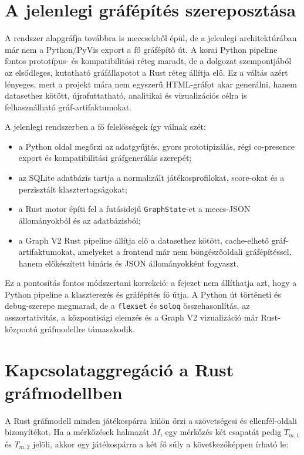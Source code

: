 ﻿\documentclass[a4paper,12pt]{report}
\begin{document}
\section{A jelenlegi gráfépítés szereposztása}

A rendszer alapgráfja továbbra is meccsekből épül, de a jelenlegi architektúrában már nem a Python/PyVis export a fő gráfépítő út. A korai Python pipeline fontos prototípus- és kompatibilitási réteg maradt, de a dolgozat szempontjából az elsődleges, kutatható gráfállapotot a Rust réteg állítja elő. Ez a váltás azért lényeges, mert a projekt mára nem egyszerű HTML-gráfot akar generálni, hanem datasethez kötött, újrafuttatható, analitikai és vizualizációs célra is felhasználható gráf-artifaktumokat.

A jelenlegi rendszerben a fő felelősségek így válnak szét:

\begin{itemize}
    \item a Python oldal megőrzi az adatgyűjtés, gyors prototipizálás, régi co-presence export és kompatibilitási gráfgenerálás szerepét;
    \item az SQLite adatbázis tartja a normalizált játékosprofilokat, score-okat és a perzisztált klasztertagságokat;
    \item a Rust motor építi fel a futásidejű \texttt{GraphState}-et a meccs-JSON állományokból és az adatbázisból;
    \item a Graph V2 Rust pipeline állítja elő a datasethez kötött, cache-elhető gráf-artifaktumokat, amelyeket a frontend már nem böngészőoldali gráfépítéssel, hanem előkészített bináris és JSON állományokként fogyaszt.
\end{itemize}

Ez a pontosítás fontos módszertani korrekció: a fejezet nem állíthatja azt, hogy a Python pipeline a klaszterezés és gráfépítés fő útja. A Python út történeti és debug-szerepe megmarad, de a \texttt{flexset} és \texttt{soloq} összehasonlítás, az asszortativitás, a központisági elemzés és a Graph V2 vizualizáció már Rust-központú gráfmodellre támaszkodik.

\section{Kapcsolataggregáció a Rust gráfmodellben}

A Rust gráfmodell minden játékospárra külön őrzi a szövetségesi és ellenfél-oldali bizonyítékot. Ha a mérkőzések halmazát $M$, egy mérkőzés két csapatát pedig $T_{m,1}$ és $T_{m,2}$ jelöli, akkor egy játékospárra a két fő súly a következőképpen írható le:
\end{document}
